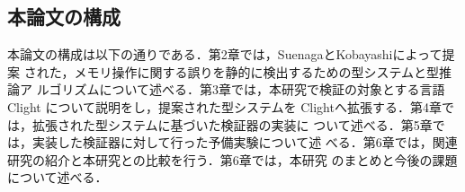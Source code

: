 \label{object}

\subsection{本論文の構成}
本論文の構成は以下の通りである．第2章では，SuenagaとKobayashiによって提案
された，メモリ操作に関する誤りを静的に検出するための型システムと型推論ア
ルゴリズムについて述べる．第3章では，本研究で検証の対象とする言語 Clight
\cite{DBLP:journals/jar/BlazyL09}について説明をし，提案された型システムを
Clightへ拡張する．第4章では，拡張された型システムに基づいた検証器の実装に
ついて述べる．第5章では，実装した検証器に対して行った予備実験について述
べる．第6章では，関連研究の紹介と本研究との比較を行う．第6章では，本研究
のまとめと今後の課題について述べる．

\label{paper}